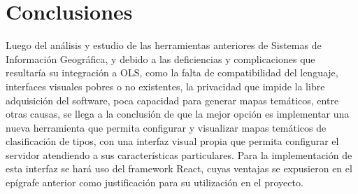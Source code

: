\section{Conclusiones}
Luego del an\'alisis y estudio de las herramientas anteriores de Sistemas de Informaci\'on Geogr\'afica, y debido a las deficiencias y complicaciones que resultar\'ia su integraci\'on a OLS, como la falta de compatibilidad del lenguaje, interfaces visuales pobres o no existentes, la privacidad que impide la libre adquisici\'on del software, poca capacidad para generar mapas tem\'aticos, entre otras causas, se llega a la conclusi\'on de que la mejor opci\'on es implementar una nueva herramienta que permita configurar y visualizar mapas tem\'aticos de clasificaci\'on de tipos, con una interfaz visual propia que permita configurar el servidor atendiendo a sus caracter\'isticas particulares. Para la implementaci\'on de esta interfaz se har\'a uso del framework React, cuyas ventajas se expusieron en el ep\'igrafe anterior como justificaci\'on para su utilizaci\'on en el proyecto.
